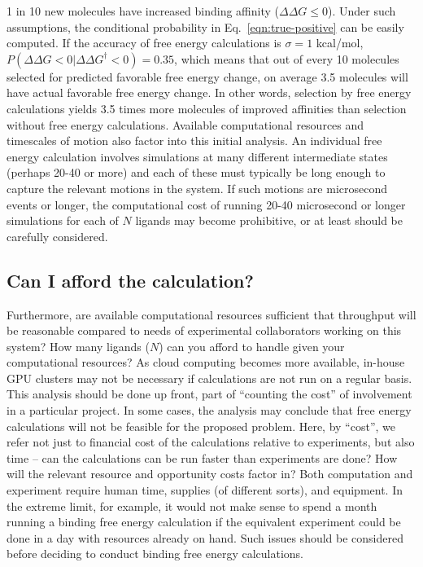 \documentclass[9pt,bestpractices]{livecoms}
\begin{document}
1 in 10 new molecules have increased binding affinity ($\Delta\Delta G
\leq 0$).  Under such assumptions, the conditional probability in
Eq.~\ref{eqn:true-positive} can be easily computed.  If the accuracy
of free energy calculations is $\sigma = 1$ kcal/mol, $P(\Delta\Delta
G<0|\Delta\Delta G^\dagger<0) = 0.35$, which means that out of every
10 molecules selected for predicted favorable free energy change, on
average 3.5 molecules will have actual favorable free energy change.
In other words, selection by free energy calculations yields 3.5 times
more molecules of improved affinities than selection without free
energy calculations.
%  
Available computational resources and timescales of motion also factor
into this initial analysis. An individual free energy calculation
involves simulations at many different intermediate states (perhaps
20-40 or more) and each of these must typically be long enough to
capture the relevant motions in the system. If such motions are
microsecond events or longer, the computational cost of running 20-40
microsecond or longer simulations for each of $N$ ligands may become
prohibitive, or at least should be carefully considered. 
%
\subsection{Can I afford the calculation?}
\label{subsec:affordability}
Furthermore, are available computational resources sufficient that throughput will be
reasonable compared to needs of experimental collaborators working on
this system? How many ligands ($N$) can you afford to handle given
your computational resources? As cloud computing becomes more available, in-house GPU clusters may not be necessary if calculations are not run on a regular basis.
This analysis should be done up front, part of ``counting the cost''
of involvement in a particular project. In some cases, the analysis may conclude that free energy calculations will not be feasible for the proposed problem.
Here, by ``cost'', we refer not just to financial cost of the calculations relative to experiments, but also time -- can the calculations can be run faster than experiments are done? How will the relevant resource and opportunity costs factor in? Both computation and experiment require human time, supplies (of different sorts), and equipment. In the extreme limit, for example, it would not make sense to spend a month running a binding free energy calculation if the equivalent experiment could be done in a day with resources already on hand. Such issues should be considered before deciding to conduct binding free energy calculations.
%
\end{document}
